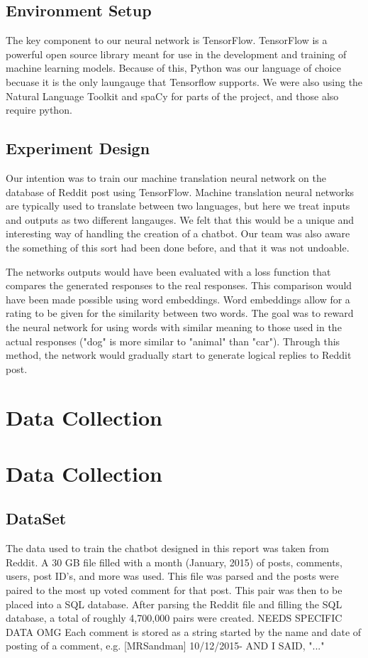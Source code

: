 \documentclass[11pt,twocolumn]{article}
\begin{document}
\subsection*{Environment Setup}
The key component to our neural network is TensorFlow.  TensorFlow is a powerful open source library meant for use in the development and training of machine learning models.  Because of this, Python was our language of choice becuase it is the only laungauge that Tensorflow supports.  We were also using the Natural Language Toolkit and spaCy for parts of the project, and those also require python.
\subsection*{Experiment Design}
Our intention was to train our machine translation neural network on the database of Reddit post using TensorFlow.  Machine translation neural networks are typically used to translate between two languages, but here we treat inputs and outputs as two different langauges.  We felt that this would be a unique and interesting way of handling the creation of a chatbot.  Our team was also aware the something of this sort had been done before, and that it was not undoable.

The networks outputs would have been evaluated with a loss function that compares the generated responses to the real responses.  This comparison would have been made possible using word embeddings.  Word embeddings allow for a rating to be given for the similarity between two words.  The goal was to reward the neural network for using words with similar meaning to those used in the actual responses ("dog" is more similar to "animal" than "car").  Through this method, the network would gradually start to generate logical replies to Reddit post.

\section{Data Collection}
\section{Data Collection}
\subsection*{DataSet}
The data used to train the chatbot designed in this report was taken from Reddit.  A 30 GB file filled with a month (January, 2015) of posts, comments, users, post ID's, and more was used.  This file was parsed and the posts were paired to the most up voted comment for that post.  This pair was then to be placed into a SQL database.  After parsing the Reddit file and filling the SQL database, a total of roughly 4,700,000 pairs were created. NEEDS SPECIFIC DATA OMG Each comment is stored as a string started by the name and date of posting of a comment, e.g. [MRSandman] 10/12/2015- AND I SAID, "..."
\end{document}
